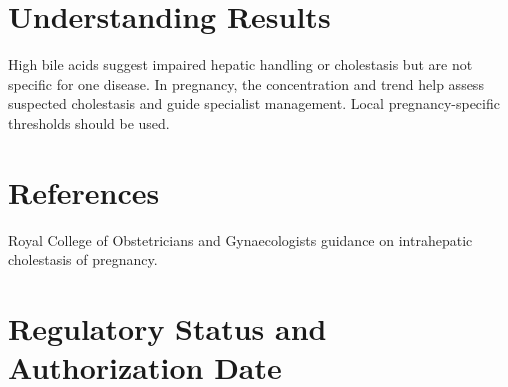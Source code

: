 \section*{Understanding Results}
High bile acids suggest impaired hepatic handling or cholestasis but are not specific for one disease. In pregnancy, the concentration and trend help assess suspected cholestasis and guide specialist management. Local pregnancy-specific thresholds should be used.

\section*{References}
Royal College of Obstetricians and Gynaecologists guidance on intrahepatic cholestasis of pregnancy.

\clearpage


\section*{Regulatory Status and Authorization Date}

\clearpage
